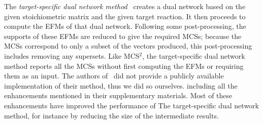 \documentclass{bioinfo}
\theoremstyle{plain}
\theoremstyle{definition}
\begin{document}
The \emph{target-specific dual network method}~\cite{Duality} creates a dual network based on the given stoichiometric matrix and the given target reaction. %
It then proceeds to compute the EFMs of that dual network. Following some post-processing, the supports of these EFMs are reduced to give the required MCSs; because the MCSs correspond to only a subset of the vectors produced, this post-processing includes removing any supersets. %
Like MCS$^2$, the target-specific dual network method reports all the MCSs without first computing the EFMs or requiring them as an input. The authors of~\cite{Duality} did not provide a publicly available implementation of their method, thus we did so ourselves. including all the enhancements mentioned in their supplementary materials. Most of these enhancements have improved the performance of The target-specific dual network method, %
for instance by reducing the size of the intermediate results. %


\end{document}
